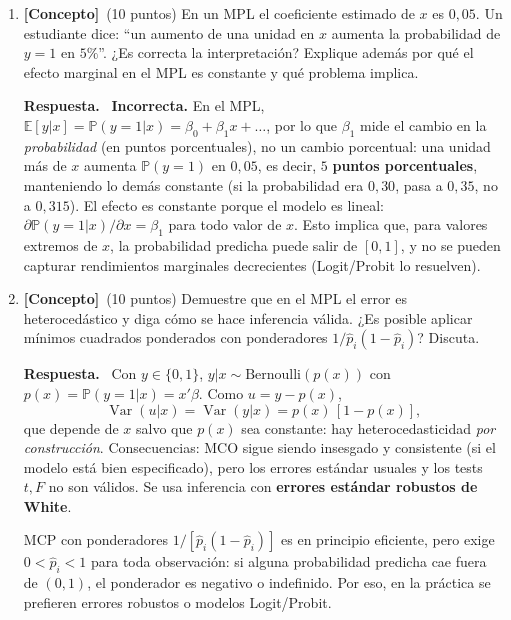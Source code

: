 \documentclass[12pt,letterpaper]{article}
\DeclareMathOperator{\var}{Var}
\newcommand{\E}[1]{\mathbb{E}\left[#1\right]}
\newcommand{\prob}[1]{\mathbb{P}\left(#1\right)}
\newenvironment{resp}{\begingroup\color{blue}\par\noindent\textbf{Respuesta.}\ }{\par\endgroup}
\newcommand{\conc}{\textbf{[Concepto]}}
\begin{document}
\begin{enumerate}[1.]

\item \conc\ (10 puntos) En un MPL el coeficiente estimado de $x$ es $0{,}05$. Un estudiante dice: ``un aumento de una unidad en $x$ aumenta la probabilidad de $y=1$ en $5\%$''. ¿Es correcta la interpretación? Explique además por qué el efecto marginal en el MPL es constante y qué problema implica.

\begin{resp}
\textbf{Incorrecta.} En el MPL, $\E{y|x}=\prob{y=1|x}=\beta_0+\beta_1x+\ldots$, por lo que $\beta_1$ mide el cambio en la \emph{probabilidad} (en puntos porcentuales), no un cambio porcentual: una unidad más de $x$ aumenta $\prob{y=1}$ en $0{,}05$, es decir, $5$ \textbf{puntos porcentuales}, manteniendo lo demás constante (si la probabilidad era $0{,}30$, pasa a $0{,}35$, no a $0{,}315$). El efecto es constante porque el modelo es lineal: $\partial\prob{y=1|x}/\partial x=\beta_1$ para todo valor de $x$. Esto implica que, para valores extremos de $x$, la probabilidad predicha puede salir de $[0,1]$, y no se pueden capturar rendimientos marginales decrecientes (Logit/Probit lo resuelven).
\end{resp}

\item \conc\ (10 puntos) Demuestre que en el MPL el error es heterocedástico y diga cómo se hace inferencia válida. ¿Es posible aplicar mínimos cuadrados ponderados con ponderadores $1/\hat p_i(1-\hat p_i)$? Discuta.

\begin{resp}
Con $y\in\{0,1\}$, $y|x\sim\text{Bernoulli}(p(x))$ con $p(x)=\prob{y=1|x}=x'\beta$. Como $u=y-p(x)$,
\[
\var(u|x)=\var(y|x)=p(x)\,[1-p(x)] ,
\]
que depende de $x$ salvo que $p(x)$ sea constante: hay heterocedasticidad \emph{por construcción}. Consecuencias: MCO sigue siendo insesgado y consistente (si el modelo está bien especificado), pero los errores estándar usuales y los tests $t,F$ no son válidos. Se usa inferencia con \textbf{errores estándar robustos de White}.

MCP con ponderadores $1/[\hat p_i(1-\hat p_i)]$ es en principio eficiente, pero exige $0<\hat p_i<1$ para toda observación: si alguna probabilidad predicha cae fuera de $(0,1)$, el ponderador es negativo o indefinido. Por eso, en la práctica se prefieren errores robustos o modelos Logit/Probit.
\end{resp}


\end{enumerate}
\end{document}
